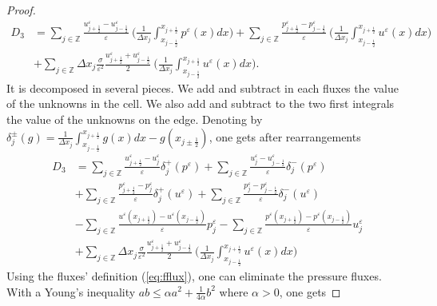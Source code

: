 \documentclass[a4paper,french,english,10pt]{article}
\newcommand\eps{\varepsilon}
\begin{document}
\begin{proof}
\begin{equation*}
\begin{aligned}
 D_3 &= \sum_{j\in \mathbb{Z}}
\frac{u_{j+\frac12 }^{\eps}-u_{j-\frac12 }^{\eps}}{\eps} \: \bigg(
\frac{1}{\Delta x_j} {\int_{x_{j-\frac12}}^{x_{j+\frac12}}}
 p^{\eps}(x) dx \bigg)
+\sum_{j\in \mathbb{Z}}
\frac{p_{j+\frac12 }^{\eps}-p_{j-\frac12 }^{\eps}}{\eps} \: \bigg(
\frac{1}{\Delta x_j} 
{\int_{x_{j-\frac12}}^{x_{j+\frac12}}}
 u^{\eps}(x) dx \bigg) \\
&+\sum_{j\in \mathbb{Z}} \Delta x_j  \frac{\sigma}{\eps^2}
\frac{u_{j+\frac12 }^{\eps}+u_{j-\frac12 }^{\eps}}{2}\: \bigg(
\frac{1}{\Delta x_j} {\int_{x_{j-\frac12}}^{x_{j+\frac12}}}
 u^{\eps}(x) dx \bigg).
\end{aligned}
\end{equation*}
 It is  decomposed in several pieces.
We add and subtract in each fluxes  the value of the unknowns in the
cell. We also add and subtract to the two first  integrals the value of the
unknowns on the edge. Denoting by $\delta_{j }^\pm
\left( g \right) =\frac{1}{\Delta
x_j} {\int_{x_{j-\frac12}}^{x_{j+\frac12}}} g(x) dx -g(x_{j\pm\frac12 })$,
 one gets after rearrangements
\begin{equation*}
\begin{aligned}
 D_3 &= \underset{j\in \mathbb{Z}}{\sum}
\frac{u_{j+\frac12 }^{\eps}-u_j^{\eps}}{\eps} \delta_{j}^+\left(p^{\eps}\right)+
\underset{j\in \mathbb{Z}}{\sum}
\frac{u^{\eps}_j-u_{j-\frac12 }^{\eps}}{\eps}\delta_{j}^-\left(p^{\eps}\right)
\\
& + \underset{j\in \mathbb{Z}}{\sum}
\frac{p_{j+\frac12 }^{\eps}-p_{j}^{\eps}}{\eps} 
\delta_{j}^+\left(u^{\eps}\right)
+\underset{j\in \mathbb{Z}}{\sum}
\frac{p^{\eps}_j-p_{j-\frac12 }^{\eps}}{\eps} 
\delta_{j}^-\left(u^{\eps}\right) \\
&-\underset{j\in \mathbb{Z}}{\sum} 
\frac{u^{\eps}(x_{j+\frac12 })-u^{\eps}(x_{j-\frac12 })}{\eps} 
p^{\eps}_j -
\underset{j\in \mathbb{Z}}{\sum} 
\frac{p^{\eps}(x_{j+\frac12 })-p^{\eps}(x_{j-\frac12 })}{\eps}
u^{\eps}_j  \\
&+ \underset{j\in \mathbb{Z}}{\sum} \Delta x_j  \frac{\sigma}{\eps^2}
\frac{u_{j+\frac12 }^{\eps}+u_{j-\frac12 }^{\eps}}{2}\: \bigg(
\frac{1}{\Delta x_j} {\int_{x_{j-\frac12}}^{x_{j+\frac12}}}u^{\eps}(x) dx \bigg)
\end{aligned}
\end{equation*}
Using the fluxes' definition (\ref{eq:fflux}), one can 
eliminate the pressure fluxes. With
 a Young's inequality 
$ab\leq \alpha a^2+\frac1{4\alpha }b^2$ where $\alpha>0$, one gets 

\end{proof}
\end{document}

